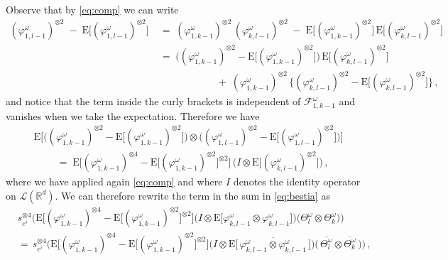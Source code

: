 \documentclass[a4paper,reqno,11pt]{amsart}
\numberwithin{equation}{section}
\newcommand{\cF}{{\ensuremath{\mathcal F}} }
\newcommand{\cL}{{\ensuremath{\mathcal L}} }
\newcommand{\go}{\omega}
\newcommand{\R}{\mathbb{R}}
\def\bE{\ensuremath{\bs{\mathrm{E}}}}
\def\bs{\boldsymbol}
\renewcommand{\phi}{\varphi}
\begin{document}
Observe that by \eqref{eq:comp} we can write
\begin{equation}
\begin{split}
	(\phi_{1,l-1}^\go)^{\otimes 2} \;-\; \bE\big[ (\phi_{1,l-1}^\go)^{\otimes 2} \big]
	& \;=\; (\phi_{1,k-1}^\go)^{\otimes 2} \, (\phi_{k, l-1}^\go)^{\otimes 2}
	\;-\; \bE\big[ (\phi_{1,k-1}^\go)^{\otimes 2} \big] \,
	\bE\big[ (\phi_{k,l-1}^\go)^{\otimes 2} \big]\\
	& \;=\; \Big( (\phi_{1,k-1}^\go)^{\otimes 2} 
	- \bE\big[ (\phi_{1,k-1}^\go)^{\otimes 2} \big] \Big) \,
	\bE\big[ (\phi_{k,l-1}^\go)^{\otimes 2} \big] \\
	& \qquad \qquad \qquad + \; (\phi_{1,k-1}^\go)^{\otimes 2} \,
	\Big\{ (\phi_{k, l-1}^\go)^{\otimes 2} - \bE\big[ (\phi_{k,l-1}^\go)^{\otimes 2} \big] \Big\} \,,
\end{split}
\end{equation}
and notice that the term inside the curly brackets is independent
of $\cF^\go_{1,k-1}$ and vanishes when we take
the expectation. Therefore we have
\begin{equation}
\begin{split}
	& \bE \Big[ 
	\big( (\phi_{1,k-1}^\go)^{\otimes 2} - \bE \big[ (\phi_{1,k-1}^\go)^{\otimes 2} \big] 
	\big) \otimes \big( (\phi_{1,l-1}^\go)^{\otimes 2} - \bE\big[ (\phi_{1,l-1}^\go)^{\otimes 2}
	\big] \big) \Big] \\
	& \qquad \;=\;
	\bE \Big[(\phi_{1,k-1}^\go)^{\otimes 4} - 
	\bE \big[ (\phi_{1,k-1}^\go)^{\otimes 2} \big] ^{\otimes 2} \Big] \,
	\big( I \otimes \bE\big[ (\phi_{k,l-1}^\go)^{\otimes 2} \big] \big) \,,
\end{split}
\end{equation}
where we have applied again \eqref{eq:comp} and where $I$ denotes the
identity operator on $\cL(\R^d)$. We can therefore rewrite
the term in the sum in \eqref{eq:bestia} as
\begin{equation} \label{eq:combine}
\begin{split}
	& s_{e^i}^{\otimes 4} 	\Big( 
	\bE \Big[(\phi_{1,k-1}^\go)^{\otimes 4} - 
	\bE \big[ (\phi_{1,k-1}^\go)^{\otimes 2} \big]^{\otimes 2} \Big]
	\big( I \otimes \bE\big[ \phi_{k,l-1}^\go \otimes \phi_{k,l-1}^\go \big] \big)
	\big( \Theta^\go_l \otimes \Theta^\go_k \big) \Big) \\
	& =\, s_{e^i}^{\otimes 4} 	\Big( 
	\bE \Big[(\phi_{1,k-1}^\go)^{\otimes 4} - 
	\bE \big[ (\phi_{1,k-1}^\go)^{\otimes 2} \big]^{\otimes 2} \Big]
	\big( I \otimes \bE\big[\, \overline{\phi_{k,l-1}^\go \otimes \phi_{k,l-1}^\go} \, \big] \big)
	\big(\, \overline{\Theta^\go_l} \otimes \overline{\Theta^\go_k}\, \big) \Big) \,,
\end{split}
\end{equation}
\end{document}
